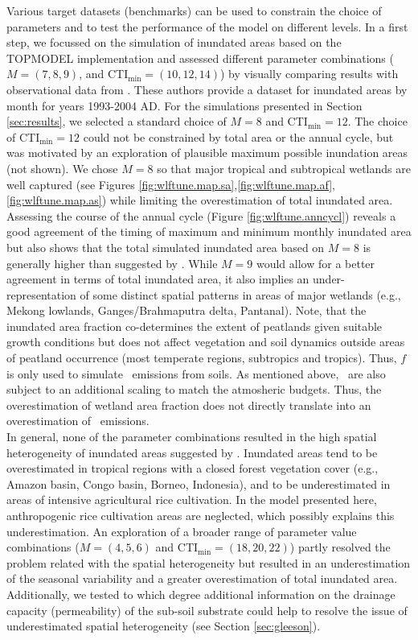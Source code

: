 Various target datasets (benchmarks) can be used to constrain the choice of parameters and to test the performance of the model on different levels. In a first step, we focussed on the simulation of inundated areas based on the TOPMODEL implementation and assessed different parameter combinations ($M=(7,8,9)$, and CTI$_{\text{min}}=(10,12,14)$) by visually comparing results with observational data from \citet{prigent07grl}. These authors provide a dataset for inundated areas by month for years 1993-2004 AD. For the simulations presented in Section \ref{sec:results}, we selected a standard choice of $M=8$ and CTI$_{\text{min}}=12$. The choice of CTI$_{\text{min}}=12$ could not be constrained by total area or the annual cycle, but was motivated by an exploration of plausible maximum possible inundation areas (not shown). We chose $M=8$ so that major tropical and subtropical wetlands are well captured (see Figures \ref{fig:wlftune.map.sa},\ref{fig:wlftune.map.af},\ref{fig:wlftune.map.as}) while limiting the overestimation of total inundated area. Assessing the course of the annual cycle (Figure \ref{fig:wlftune.anncycl}) reveals a good agreement of the timing of maximum and minimum monthly inundated area but also shows that the total simulated inundated area based on $M=8$ is generally higher than suggested by \citet{prigent07grl}. While $M=9$ would allow for a better agreement in terms of total inundated area, it also implies an under-representation of some distinct spatial patterns in areas of major wetlands (e.g., Mekong lowlands, Ganges/Brahmaputra delta, Pantanal). Note, that the inundated area fraction co-determines the extent of peatlands given suitable growth conditions but does not affect vegetation and soil dynamics outside areas of peatland occurrence (most temperate regions, subtropics and tropics). Thus, $f$ is only used to simulate \chh\ emissions from soils. As mentioned above, \chh\ are also subject to an additional scaling to match the atmosheric budgets. Thus, the overestimation of wetland area fraction does not directly translate into an overestimation of \chh\ emissions.\\

In general, none of the parameter combinations resulted in the high spatial heterogeneity of inundated areas suggested by \citet{prigent07grl}. Inundated areas tend to be overestimated in tropical regions with a closed forest vegetation cover (e.g., Amazon basin, Congo basin, Borneo, Indonesia), and to be underestimated in areas of intensive agricultural rice cultivation. In the model presented here, anthropogenic rice cultivation areas are neglected, which possibly explains this underestimation. An exploration of a broader range of parameter value combinations ($M=(4,5,6)$ and CTI$_{\text{min}}=(18,20,22)$) partly resolved the problem related with the spatial heterogeneity but resulted in an underestimation of the seasonal variability and a greater overestimation of total inundated area. Additionally, we tested to which degree additional information on the drainage capacity (permeability) of the sub-soil substrate could help to resolve the issue of underestimated spatial heterogeneity (see Section \ref{sec:gleeson}).\\

